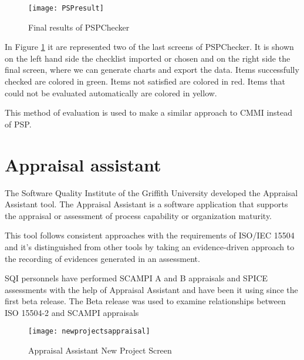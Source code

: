 \begin{figure}[h]
	\begin{center}
		\leavevmode
		\texttt{[image: PSPresult]}
		\caption{Final results of PSPChecker}
		\label{fig:PSPresults}
	\end{center}
\end{figure}

In Figure \ref{fig:PSPresults} it are represented two of the last screens of PSPChecker. It is shown on the left hand side the checklist imported or chosen and on the right side the final screen, where we can generate charts and export the data. 
Items successfully checked are colored in green. Items not satisfied are colored in red. Items that could not be evaluated automatically are colored in yellow.

This method of evaluation is used to make a similar approach to CMMI instead of PSP.

\section{Appraisal assistant}

The Software Quality Institute of the Griffith University 	\citep{SoftwareQuality2015} developed the Appraisal Assistant tool. The Appraisal Assistant \citep{Appraisal2015} is a software application that supports the appraisal or assessment of process capability or organization maturity.

This tool follows consistent approaches with the requirements of ISO/IEC 15504 \citep{ISOIEC} and it's distinguished from other tools by taking an evidence-driven approach to the recording of evidences generated in an assessment.

SQI personnels have performed SCAMPI A and B appraisals and SPICE assessments with the help of Appraisal Assistant and have been it using since the first beta release. The Beta release was used to examine relationships between ISO 15504-2 and SCAMPI appraisals

\begin{figure}[h]
	\begin{center}
		\leavevmode
		\texttt{[image: newprojectsappraisal]}
		\caption{Appraisal Assistant New Project Screen}
		\label{fig:newprojectsappraisal}
	\end{center}
\end{figure}

